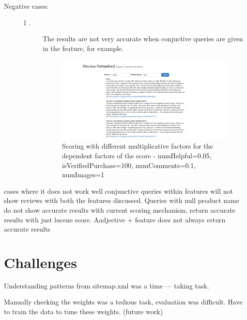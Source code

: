 \documentclass{article}
\begin{document}
	\begin{description}
		\item[Negative cases:] 
			\begin{description}
				\item[1 .] The results are not very accurate when conjuctive queries are given in the feature, for example.
					\begin{figure}[ht!]
					  \centering
					  \includegraphics[width=1\textwidth]{scoring_piecewise_normalization}
					  \caption{Scoring with different multiplicative factors for the dependent factors of the score - numHelpful=0.05, isVerifiedPurchase=100, numComments=0.1, numImages=1~\label{fig:Search_Engine}}
					\end{figure}

			\end{description}
	\end{description}
cases where it does not work well
conjunctive queries within features will not show reviews with both the features discussed.
Queries with null product name do not show accurate results with current scoring mechanism, return accurate results with just lucene score. Aadjective + feature does not always return accurate results

\section{Challenges}
\begin{description}
\item Understanding patterns from sitemap.xml was a time --- taking task.
\item Manually checking the weights was a tedious task, evaluation was difficult. Have to train the data to tune these weights. (future work)
\end{description}
\end{document}
